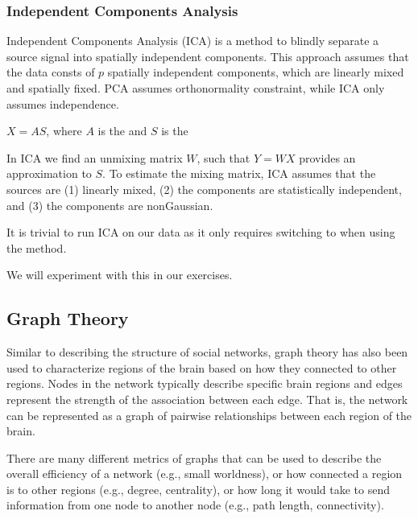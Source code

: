 \documentclass[letterpaper,10pt,english]{sphinxmanual}
\begin{document}
\noindent{}


\subsubsection{Independent Components Analysis}
\label{\detokenize{content/Connectivity:independent-components-analysis}}
Independent Components Analysis (ICA) is a method to blindly separate a source signal into spatially independent components. This approach assumes that the data consts of \(p\) spatially independent components, which are linearly mixed and spatially fixed. PCA assumes orthonormality constraint, while ICA only assumes independence.

\(X = AS\), where \(A\) is the  and \(S\) is the 

In ICA we find an un\sphinxhyphen{}mixing matrix \(W\), such that \(Y = WX\) provides an approximation to \(S\). To estimate the mixing matrix, ICA assumes that the sources are (1) linearly mixed, (2) the components are statistically independent, and (3) the components are non\sphinxhyphen{}Gaussian.

It is trivial to run ICA on our data as it only requires switching  to  when using the  method.

We will experiment with this in our exercises.


\subsection{Graph Theory}
\label{\detokenize{content/Connectivity:graph-theory}}
Similar to describing the structure of social networks, graph theory has also been used to characterize regions of the brain based on how they connected to other regions. Nodes in the network typically describe specific brain regions and edges represent the strength of the association between each edge. That is, the network can be represented as a graph of pairwise relationships between each region of the brain.

There are many different metrics of graphs that can be used to describe the overall efficiency of a network (e.g., small worldness), or how connected a region is to other regions (e.g., degree, centrality), or how long it would take to send information from one node to another node (e.g., path length, connectivity).
\end{document}
